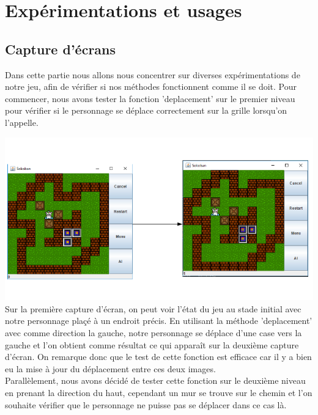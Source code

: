 \documentclass[a4paper,12pt]{article} %
\begin{document}
\section{Expérimentations et usages}

\subsection{Capture d'écrans}

Dans cette partie nous allons nous concentrer sur diverses expérimentations de notre jeu, afin de vérifier si nos méthodes fonctionnent comme il se doit. Pour commencer, nous avons tester la fonction 'deplacement' sur le premier niveau pour vérifier si le personnage se déplace correctement sur la grille lorsqu'on l'appelle.

\includegraphics[scale=1]{Test1.PNG}\\

Sur la première capture d'écran, on peut voir l'état du jeu au stade initial avec notre personnage plaçé à un endroit précis. En utilisant la méthode 'deplacement' avec comme direction la gauche, notre personnage se déplace d'une case vers la gauche et l'on obtient comme résultat ce qui apparaît sur la deuxième capture d'écran. On remarque donc que le test de cette fonction est efficace car il y a bien eu la mise à jour du déplacement entre ces deux images.\\

Parallèlement, nous avons décidé de tester cette fonction sur le deuxième niveau en prenant la direction du haut, cependant un mur se trouve sur le chemin et l'on souhaite vérifier que le personnage ne puisse pas se déplacer dans ce cas là.
\end{document}
